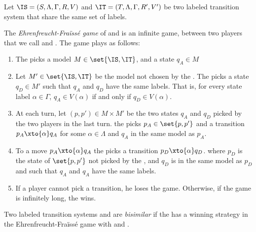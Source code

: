 \begin{definition}
    Let $\IS = (S, \Lambda, \Gamma, R, V)$
    and $\IT = (T, \Lambda, \Gamma, R', V')$
    be two labeled transition system that share the same set of labels.

    The \emph{Ehrenfreucht-Fraïssé game} of \IS and \IT is
    an infinite game, between two players that we
    call \Attacker and \Defender.
    The game plays as follows:
    \begin{enumerate}
        \item The \Attacker picks a model $M \in \set{\IS, \IT}$,
            and a state $q_A \in M$
        \item Let $M' \in \set{\IS, \IT}$ be the model not chosen by the \Attacker.
            The \Defender picks a state $q_D \in M'$
            such that $q_A$ and $q_D$ have the same labels.
            That is, for every state label $\alpha \in \Gamma$,
            $q_A \in V(\alpha)$ if and only if $q_D \in V(\alpha)$.

        \item At each turn, let $(p, p') \in M \times M'$ be the two states $q_A$ and $q_D$ picked by the two players
            in the last turn.
            the \Attacker picks $p_A \in \set{p, p'}$
            and a transition $p_A \xto{\alpha} q_A$
            for some $\alpha \in \Lambda$ and $q_A$ in the same model as $p_A$.
        \item To a move $p_A \xto{\alpha} q_A$
            the \Defender picks a transition $p_D \xto{\alpha} q_D$.
            where $p_D$ is the state of $\set{p, p'}$ not picked by the \Attacker,
            and $q_D$ is in the same model as $p_D$
            and such that $q_A$ and $q_A$ have the same labels.
        \item If a player cannot pick a transition,
            he loses the game. Otherwise, if the game is infinitely long,
            the \Defender wins.
    \end{enumerate}
\end{definition}

\begin{definition}
    Two labeled transition systems \IS and \IT are \emph{bisimilar} if
    the \Defender has a winning strategy in the Ehrenfreucht-Fraïssé game
    with \IS and \IT.
\end{definition}

